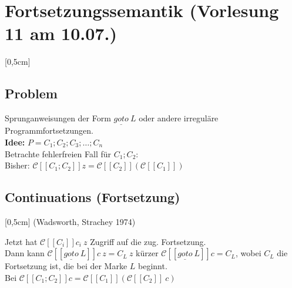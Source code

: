 \section{Fortsetzungssemantik \tiny (Vorlesung 11 am 10.07.)}
[0,5cm]
\subsection{Problem}
Sprunganweisungen der Form $\underline{goto}\ L$ oder andere irreguläre Programmfortsetzungen.\\
\textbf{Idee:} $P = C_1;C_2;C_3;\dots;C_n$\\
Betrachte fehlerfreien Fall für $C_1;C_2$:\\
Bisher: $\mathcal{C}[\![ C_1;C_2 ]\!] z = \mathcal{C}[\![ C_2 ]\!](\mathcal{C}[\![ C_1 ]\!]) $\\

\subsection{Continuations (Fortsetzung)}
[0,5cm]
(Wadsworth, Strachey 1974)

Jetzt hat $\mathcal{C}[\![ C_i ]\!]c_i\ z$ Zugriff auf die zug. Fortsetzung.\\
Dann kann $\mathcal{C}[\![ \underline{goto}\ L ]\!]c\ z = C_L \ z$ kürzer $\mathcal{C}[\![ \underline{goto}\ L ]\!]c = C_L$, wobei $C_L$ die Fortsetzung ist, die bei der Marke $L$ beginnt.\\
Bei $\mathcal{C}[\![ C_1;C_2 ]\!] c = \mathcal{C}[\![ C_1 ]\!](\mathcal{C}[\![ C_2 ]\!] \ c) $\\

